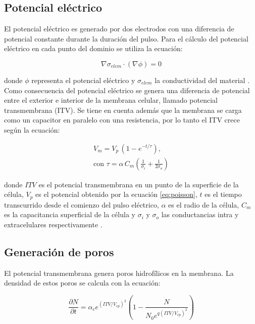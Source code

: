 \documentclass[11pt, twocolumn]{article}
\begin{document}
\subsection{Potencial eléctrico}
El potencial eléctrico es generado por dos electrodos con una diferencia de potencial constante durante la duración del pulso. Para el cálculo del potencial eléctrico en cada punto del dominio se utiliza la ecuación: 

\begin{equation} \label{eq:poisson}
	\nabla \sigma_{elem} \cdot (\nabla \phi) = 0 
\end{equation}

donde $\phi$ representa el potencial eléctrico y $\sigma_{elem}$ la conductividad del material \cite[p.~88]{fem-electro}.\\

Como consecuencia del potencial eléctrico se genera una diferencia de potencial entre el exterior e interior de la membrana celular, llamado potencial transmembrana (ITV). Se tiene en cuenta además que la membrana se carga como un capacitor en paralelo con una resistencia, por lo tanto el ITV crece según la ecuación:


\begin{equation} \label{eq:capacit} \begin{split}
	V_m = V_p\, (1 - e^{-t/\tau}) , \\ \textrm{con } \tau = \alpha\, C_m \left( \frac{1}{\sigma_i} + \frac{1}{2 \sigma_o} \right)
\end{split} \end{equation}

donde $ITV$ es el potencial transmembrana en un punto de la superficie de la célula, $V_p$ es el potencial obtenido por la ecuación \eqref{eq:poisson}, $t$ es el tiempo transcurrido desde el comienzo del pulso eléctrico, $\alpha$ es el radio de la célula, $C_m$ es la capacitancia superficial de la célula y $\sigma_i$ y $\sigma_o$ las conductancias intra y extracelulares respectivamente \cite{krass}.\\


\subsection{Generación de poros}
El potencial transmembrana genera poros hidrofílicos en la membrana. La densidad de estos poros se calcula con la ecuación:

\begin{equation} \label{eq:poros-crea}
	\frac{\partial N}{\partial t} = \alpha_c e^{(ITV/V_{ep})^2} \left( 1 - \frac{N}{N_0 e^{q \left(ITV/V_{ep} \right) ^2}} \right)
\end{equation}
\end{document}
